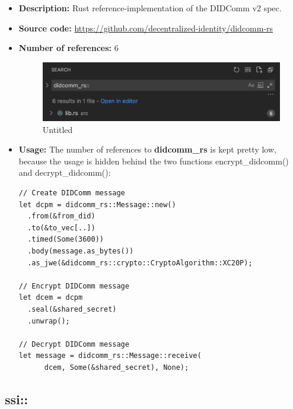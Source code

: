 \begin{itemize}
\item
  \textbf{Description:} Rust reference-implementation of the DIDComm v2
  spec.
\item
  \textbf{Source code:}
  \url{https://github.com/decentralized-identity/didcomm-rs}
\item
  \textbf{Number of references:} 6

  \begin{figure}
  \centering
  \includegraphics{Architecture 1442df162dbe45f4a423ba37d3e12363/Untitled 9.png}
  \caption{Untitled}
  \end{figure}
\item
  \textbf{Usage:} The number of references to \textbf{didcomm\_rs} is
  kept pretty low, because the usage is hidden behind the two functions
  encrypt\_didcomm() and decrypt\_didcomm():

\begin{lstlisting}
// Create DIDComm message
let dcpm = didcomm_rs::Message::new()
  .from(&from_did)
  .to(&to_vec[..])
  .timed(Some(3600))
  .body(message.as_bytes())
  .as_jwe(&didcomm_rs::crypto::CryptoAlgorithm::XC20P);

// Encrypt DIDComm message
let dcem = dcpm
  .seal(&shared_secret)
  .unwrap();

// Decrypt DIDComm message
let message = didcomm_rs::Message::receive(
      dcem, Some(&shared_secret), None);
\end{lstlisting}
\end{itemize}

\hypertarget{ssi}{%
\subsection{ssi::}\label{ssi}}

